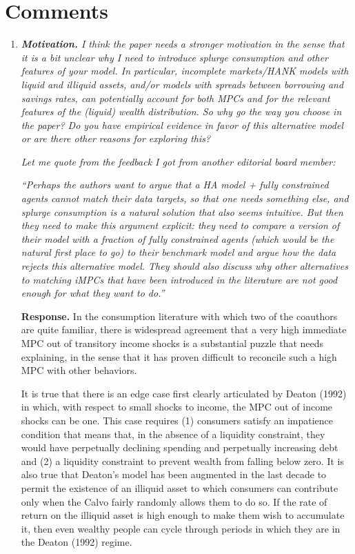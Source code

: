 \documentclass[12pt,letterpaper,english]{article}
\begin{document}
\section{Comments}
\begin{enumerate}
	
\item \textit{\textbf{Motivation.} I think the paper needs a stronger motivation in the sense that it is a bit unclear why I need to introduce splurge consumption and other features of your model. In particular, incomplete markets/HANK models with liquid and	illiquid assets, and/or models with spreads between borrowing and savings rates, can potentially account for both MPCs and for the relevant features of the (liquid)	wealth distribution. So why go the way you choose in the paper? Do you have empirical evidence in favor of this alternative model or are there other reasons for exploring this?}

\textit{Let me quote from the feedback I got from another editorial board member:}

\textit{``Perhaps the authors want to argue that a HA model + fully constrained agents	cannot match their data targets, so that one needs something else, and splurge	consumption is a natural solution that also seems intuitive. But then they need to make this argument explicit: they need to compare a version of their model with a fraction of fully constrained agents (which would be the natural first place to go)	to their benchmark model and argue how the data rejects this alternative model. They should also discuss why other alternatives to matching iMPCs that have been	introduced in the literature are not good enough for what they want to do.''}	

\noindent \textbf{Response.} In the consumption literature with which two of the coauthors are quite familiar, there is widespread agreement that a very high immediate MPC out of transitory income shocks is a substantial puzzle that needs explaining, in the sense that it has proven difficult to reconcile such a high MPC with other behaviors.

It is true that there is an edge case first clearly articulated by Deaton (1992) in which, with respect to small shocks to income, the MPC out of income shocks can be one. This case requires (1) consumers satisfy an impatience condition that means that, in the absence of a liquidity constraint, they would have perpetually declining spending and perpetually increasing debt and (2) a liquidity constraint to prevent wealth from falling below zero. It is also true that Deaton's model has been augmented in the last decade to permit the existence of an illiquid asset to which consumers can contribute only when the Calvo fairly randomly allows them to do so.  If the rate of return on the illiquid asset is high enough to make them wish to accumulate it, then even wealthy people can cycle through periods in which they are in the Deaton (1992) regime.


\end{enumerate}
\end{document}
